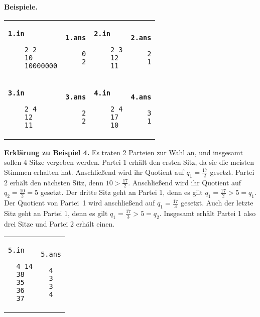 \documentclass{uebung_cs}
\begin{document}
\begin{aufgabe}
  \textbf{Beispiele.}\\
	\begin{tabular}{p{}p{}p{}p{}}
	\texttt{\bfseries 1.in}
	\begin{verbatim}
	2 2
	10
	10000000
	\end{verbatim}
	&
	\texttt{\bfseries 1.ans}
	\begin{verbatim}
	0
	2
	\end{verbatim}
	&
	\texttt{\bfseries 2.in}
	\begin{verbatim}
	2 3
	12
	11
	\end{verbatim}
	&
	\texttt{\bfseries 2.ans}
	\begin{verbatim}
	2
	1
	\end{verbatim}
	\\[\baselineskip]
	\texttt{\bfseries 3.in}
	\begin{verbatim}
	2 4
	12
	11
	\end{verbatim}
	&
	\texttt{\bfseries 3.ans}
	\begin{verbatim}
	2
	2
	\end{verbatim}
	&
	\texttt{\bfseries 4.in}
	\begin{verbatim}
	2 4
	17
	10
	\end{verbatim}
	&
	\texttt{\bfseries 4.ans}
	\begin{verbatim}
	3
	1
	\end{verbatim}
	\end{tabular}
  
  \textbf{Erklärung zu Beispiel 4.}
  Es traten 2 Parteien zur Wahl an, und insgesamt sollen 4 Sitze vergeben werden.
  Partei 1 erhält den ersten Sitz, da sie die meisten Stimmen erhalten hat. 
  Anschließend wird ihr Quotient auf $q_1 = \frac{17}{2}$ gesetzt.
  Partei 2 erhält den nächsten Sitz, denn $10 > \frac{17}{2}$.
  Anschließend wird ihr Quotient auf $q_2 = \frac{10}{2} = 5$ gesetzt.
  Der dritte Sitz geht an Partei 1, denn es gilt $q_1 = \frac{17}{2} > 5 = q_1$.
  Der Quotient von Partei~1 wird anschließend auf $q_1 = \frac{17}{3}$ gesetzt.
  Auch der letzte Sitz geht an Partei 1, denn es gilt $q_1 = \frac{17}{3} > 5 = q_2$.
  Insgesamt erhält Partei 1 also drei Sitze und Partei 2 erhält einen.
  
  \begin{tabular}{p{}p{}}
  \texttt{5.in}
  \begin{verbatim}
  4 14
  38
  35
  36
  37
  \end{verbatim}
  &
  \texttt{5.ans}
  \begin{verbatim}
  4
  3
  3
  4
  \end{verbatim}
  \end{tabular}
  

\end{aufgabe}
\end{document}
